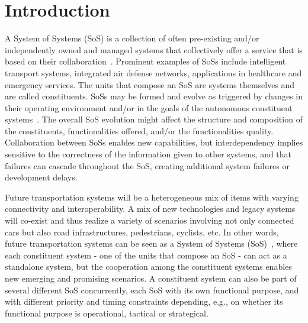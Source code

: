 \section{Introduction} 

A System of Systems (SoS) is a collection of often pre-existing and/or independently owned and managed systems that collectively offer a service that is based on their collaboration~\cite{Fitzgerald2014,SoS}. Prominent examples of SoSs include intelligent transport systems, integrated air defense networks, applications in healthcare and emergency services. The units that compose an SoS are systems themselves and are called constituents. SoSs may be formed and evolve as triggered by changes in their operating environment and/or in the goals of the autonomous constituent systems~\cite{Fitzgerald2014,MeaningOfOf}. The overall SoS evolution might affect the structure and composition of the constituents, functionalities offered, and/or the functionalities quality. Collaboration between SoSs enables new capabilities, but interdependency implies sensitive to the correctness of the information given to other systems, and that failures can cascade throughout the SoS, creating additional system failures or development delays.


Future transportation systems will be a heterogeneous mix of items with varying connectivity and interoperability. A mix of new technologies and legacy systems will co-exist and thus realize a variety of scenarios involving not only connected cars but also road infrastructures, pedestrians, cyclists, etc. In other words, future transportation systems can be seen as a System of Systems (SoS)~\cite{Fitzgerald2014,SoS,MeaningOfOf}, where each constituent system - one of the units that compose an SoS - can act as a standalone system, but the cooperation among the constituent systems enables new emerging and promising scenarios. A constituent system can also be part of several different SoS concurrently, each SoS with its own functional purpose, and with different priority and timing constraints depending, e.g., on whether its functional purpose is operational, tactical or strategical.

